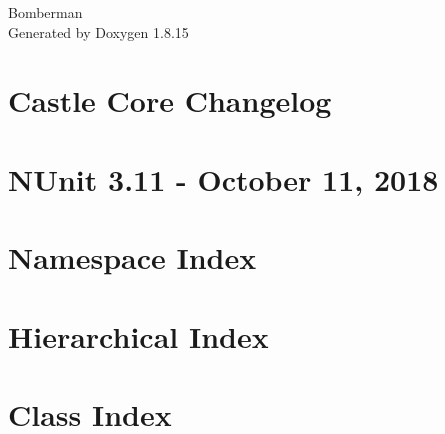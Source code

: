 \let\mypdfximage\pdfximage\def\pdfximage{\immediate\mypdfximage}\documentclass[twoside]{book}
\newcommand{\+}{\discretionary{\mbox{\scriptsize$\hookleftarrow$}}{}{}}
\newcommand{\clearemptydoublepage}{%
  \newpage{\pagestyle{empty}\cleardoublepage}%
}
\begin{document}
\hypersetup{pageanchor=false,
             bookmarksnumbered=true,
             pdfencoding=unicode
            }
\begin{titlepage}
\vspace*{7cm}
\begin{center}%
{\Large Bomberman }\\
\vspace*{1cm}
{\large Generated by Doxygen 1.8.15}\\
\end{center}
\end{titlepage}
\clearemptydoublepage
{}
\tableofcontents
\clearemptydoublepage
{}
\hypersetup{pageanchor=true}

\chapter{Castle Core Changelog}
\label{md__c_1__users__kov_xC3_xA1cs_levente__documents_oenik_prog4_2019_1_p71jvi_u41kaf__bomberman_pac8411ecab405be0f9a0c085b44f85e0f5}

\chapter{N\+Unit 3.11 -\/ October 11, 2018}
\label{md__c_1__users__kov_xC3_xA1cs_levente__documents_oenik_prog4_2019_1_p71jvi_u41kaf__bomberman_pac32f5194f3da76073f3e5cd7f846dccc0}

\chapter{Namespace Index}

\chapter{Hierarchical Index}

\chapter{Class Index}

\end{document}
